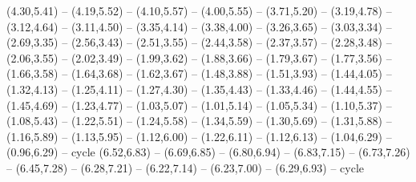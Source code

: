 {(4.30,5.41) -- (4.19,5.52) -- (4.10,5.57) -- (4.00,5.55) -- (3.71,5.20) -- (3.19,4.78) -- (3.12,4.64) -- (3.11,4.50) -- (3.35,4.14) -- (3.38,4.00) -- (3.26,3.65) -- (3.03,3.34) -- (2.69,3.35) -- (2.56,3.43) -- (2.51,3.55) -- (2.44,3.58) -- (2.37,3.57) -- (2.28,3.48) -- (2.06,3.55) -- (2.02,3.49) -- (1.99,3.62) -- (1.88,3.66) -- (1.79,3.67) -- (1.77,3.56) -- (1.66,3.58) -- (1.64,3.68) -- (1.62,3.67) -- (1.48,3.88) -- (1.51,3.93) -- (1.44,4.05) -- (1.32,4.13) -- (1.25,4.11) -- (1.27,4.30) -- (1.35,4.43) -- (1.33,4.46) -- (1.44,4.55) -- (1.45,4.69) -- (1.23,4.77) -- (1.03,5.07) -- (1.01,5.14) -- (1.05,5.34) -- (1.10,5.37) -- (1.08,5.43) -- (1.22,5.51) -- (1.24,5.58) -- (1.34,5.59) -- (1.30,5.69) -- (1.31,5.88) -- (1.16,5.89) -- (1.13,5.95) -- (1.12,6.00) -- (1.22,6.11) -- (1.12,6.13) -- (1.04,6.29) -- (0.96,6.29) -- cycle
  (6.52,6.83) -- (6.69,6.85) -- (6.80,6.94) -- (6.83,7.15) -- (6.73,7.26) -- (6.45,7.28) -- (6.28,7.21) -- (6.22,7.14) -- (6.23,7.00) -- (6.29,6.93) -- cycle}
